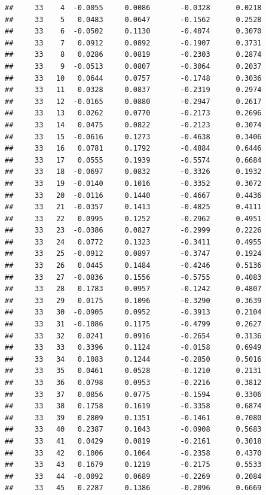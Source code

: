 \documentclass[
]{article}
\begin{document}
\begin{verbatim}
##     33    4  -0.0055     0.0086       -0.0328      0.0218  
##     33    5   0.0483     0.0647       -0.1562      0.2528  
##     33    6  -0.0502     0.1130       -0.4074      0.3070  
##     33    7   0.0912     0.0892       -0.1907      0.3731  
##     33    8   0.0286     0.0819       -0.2303      0.2874  
##     33    9  -0.0513     0.0807       -0.3064      0.2037  
##     33   10   0.0644     0.0757       -0.1748      0.3036  
##     33   11   0.0328     0.0837       -0.2319      0.2974  
##     33   12  -0.0165     0.0880       -0.2947      0.2617  
##     33   13   0.0262     0.0770       -0.2173      0.2696  
##     33   14   0.0475     0.0822       -0.2123      0.3074  
##     33   15  -0.0616     0.1273       -0.4638      0.3406  
##     33   16   0.0781     0.1792       -0.4884      0.6446  
##     33   17   0.0555     0.1939       -0.5574      0.6684  
##     33   18  -0.0697     0.0832       -0.3326      0.1932  
##     33   19  -0.0140     0.1016       -0.3352      0.3072  
##     33   20  -0.0116     0.1440       -0.4667      0.4436  
##     33   21  -0.0357     0.1413       -0.4825      0.4111  
##     33   22   0.0995     0.1252       -0.2962      0.4951  
##     33   23  -0.0386     0.0827       -0.2999      0.2226  
##     33   24   0.0772     0.1323       -0.3411      0.4955  
##     33   25  -0.0912     0.0897       -0.3747      0.1924  
##     33   26   0.0445     0.1484       -0.4246      0.5136  
##     33   27  -0.0836     0.1556       -0.5755      0.4083  
##     33   28   0.1783     0.0957       -0.1242      0.4807  
##     33   29   0.0175     0.1096       -0.3290      0.3639  
##     33   30  -0.0905     0.0952       -0.3913      0.2104  
##     33   31  -0.1086     0.1175       -0.4799      0.2627  
##     33   32   0.0241     0.0916       -0.2654      0.3136  
##     33   33   0.3396     0.1124       -0.0158      0.6949  
##     33   34   0.1083     0.1244       -0.2850      0.5016  
##     33   35   0.0461     0.0528       -0.1210      0.2131  
##     33   36   0.0798     0.0953       -0.2216      0.3812  
##     33   37   0.0856     0.0775       -0.1594      0.3306  
##     33   38   0.1758     0.1619       -0.3358      0.6874  
##     33   39   0.2809     0.1351       -0.1461      0.7080  
##     33   40   0.2387     0.1043       -0.0908      0.5683  
##     33   41   0.0429     0.0819       -0.2161      0.3018  
##     33   42   0.1006     0.1064       -0.2358      0.4370  
##     33   43   0.1679     0.1219       -0.2175      0.5533  
##     33   44  -0.0092     0.0689       -0.2269      0.2084  
##     33   45   0.2287     0.1386       -0.2096      0.6669  

\end{verbatim}
\end{document}
